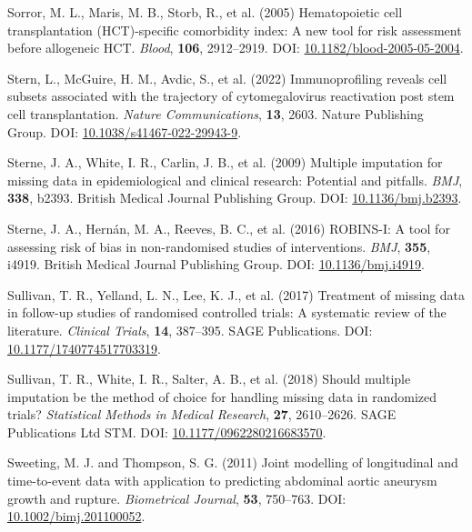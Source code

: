 \documentclass[
  letterpaper,
  DIV=11,
  numbers=noendperiod]{scrreprt}
\newlength{\cslhangindent}
\newenvironment{CSLReferences}[2] %
 {\begin{list}{}{%
  \setlength{\itemindent}{0pt}
  \setlength{\leftmargin}{0pt}
  \setlength{\parsep}{0pt}
  \ifodd #1
   \setlength{\leftmargin}{\cslhangindent}
   \setlength{\itemindent}{-1\cslhangindent}
  \fi
  \setlength{\itemsep}{#2\baselineskip}}}
 {\end{list}}
\begin{document}
\begin{CSLReferences}{1}{1}
Sorror, M. L., Maris, M. B., Storb, R., et al. (2005) Hematopoietic cell
transplantation ({HCT})-specific comorbidity index: A new tool for risk
assessment before allogeneic {HCT}. \emph{Blood}, \textbf{106},
2912--2919. DOI:
\href{https://doi.org/10.1182/blood-2005-05-2004}{10.1182/blood-2005-05-2004}.

Stern, L., McGuire, H. M., Avdic, S., et al. (2022) Immunoprofiling
reveals cell subsets associated with the trajectory of cytomegalovirus
reactivation post stem cell transplantation. \emph{Nature
Communications}, \textbf{13}, 2603. Nature Publishing Group. DOI:
\href{https://doi.org/10.1038/s41467-022-29943-9}{10.1038/s41467-022-29943-9}.

Sterne, J. A., White, I. R., Carlin, J. B., et al. (2009) Multiple
imputation for missing data in epidemiological and clinical research:
Potential and pitfalls. \emph{BMJ}, \textbf{338}, b2393. British Medical
Journal Publishing Group. DOI:
\href{https://doi.org/10.1136/bmj.b2393}{10.1136/bmj.b2393}.

Sterne, J. A., Hernán, M. A., Reeves, B. C., et al. (2016) {ROBINS-I}: A
tool for assessing risk of bias in non-randomised studies of
interventions. \emph{BMJ}, \textbf{355}, i4919. British Medical Journal
Publishing Group. DOI:
\href{https://doi.org/10.1136/bmj.i4919}{10.1136/bmj.i4919}.

Sullivan, T. R., Yelland, L. N., Lee, K. J., et al. (2017) Treatment of
missing data in follow-up studies of randomised controlled trials: {A}
systematic review of the literature. \emph{Clinical Trials},
\textbf{14}, 387--395. SAGE Publications. DOI:
\href{https://doi.org/10.1177/1740774517703319}{10.1177/1740774517703319}.

Sullivan, T. R., White, I. R., Salter, A. B., et al. (2018) Should
multiple imputation be the method of choice for handling missing data in
randomized trials? \emph{Statistical Methods in Medical Research},
\textbf{27}, 2610--2626. SAGE Publications Ltd STM. DOI:
\href{https://doi.org/10.1177/0962280216683570}{10.1177/0962280216683570}.

Sweeting, M. J. and Thompson, S. G. (2011) Joint modelling of
longitudinal and time-to-event data with application to predicting
abdominal aortic aneurysm growth and rupture. \emph{Biometrical
Journal}, \textbf{53}, 750--763. DOI:
\href{https://doi.org/10.1002/bimj.201100052}{10.1002/bimj.201100052}.


\end{CSLReferences}
\end{document}
